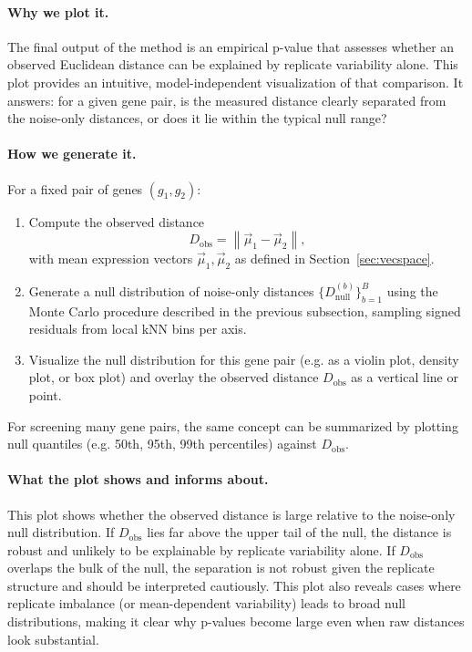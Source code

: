             \paragraph{Why we plot it.}
            The final output of the method is an empirical p-value that assesses whether an observed Euclidean distance can be explained by replicate variability alone. This plot provides an intuitive, model-independent visualization of that comparison. It answers: for a given gene pair, is the measured distance clearly separated from the noise-only distances, or does it lie within the typical null range?

            \paragraph{How we generate it.}
            For a fixed pair of genes $(g_1, g_2)$:
            \begin{enumerate}
                \item Compute the observed distance
                      \[
                      D_{\mathrm{obs}} = \left\| \vec{\mu}_1 - \vec{\mu}_2 \right\|,
                      \]
                      with mean expression vectors $\vec{\mu}_1, \vec{\mu}_2$ as defined in Section~\ref{sec:vecspace}.
                \item Generate a null distribution of noise-only distances $\{D_{\mathrm{null}}^{(b)}\}_{b=1}^B$ using the Monte Carlo procedure described in the previous subsection, sampling signed residuals from local kNN bins per axis.
                \item Visualize the null distribution for this gene pair (e.g. as a violin plot, density plot, or box plot) and overlay the observed distance $D_{\mathrm{obs}}$ as a vertical line or point.
            \end{enumerate}
            For screening many gene pairs, the same concept can be summarized by plotting null quantiles (e.g. 50th, 95th, 99th percentiles) against $D_{\mathrm{obs}}$.

            \paragraph{What the plot shows and informs about.}
            This plot shows whether the observed distance is large relative to the noise-only null distribution. If $D_{\mathrm{obs}}$ lies far above the upper tail of the null, the distance is robust and unlikely to be explainable by replicate variability alone. If $D_{\mathrm{obs}}$ overlaps the bulk of the null, the separation is not robust given the replicate structure and should be interpreted cautiously. This plot also reveals cases where replicate imbalance (or mean-dependent variability) leads to broad null distributions, making it clear why p-values become large even when raw distances look substantial.


